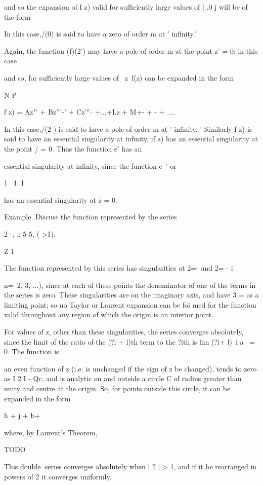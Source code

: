 {{{{and so the expansion of f z) valid for sufficiently large values of |
.0 j will be of the form

In this case,/(0) is said to have a zero of order m at ' infinity.'

%
%

Again, the function (f)(2') may have a pole of order m at the point z'
= 0; in this case

and so, for sufficiently large values of \ z\, f(z) can be expanded in
the form

N P

f z) = Az"' + Bz'''-' + Cz'"-- +...+Lz + M+- + - + ....

In this case,/(2 ) is said to have a pole of order m at ' infinity. '
Similarly f z) is said to have an essential singularity at infinity,
if z) has an essential singularity at the point / = 0. Thus the
function e' has an

essential singularity at infinity, since the function e~' or

1 \ 1\ 1

has an essential singularity at z = 0.

Example. Discuss the function represented by the series

2 -, :; 5-5, ( >1).

Z 1

The function represented by this series has singularities at 2=- and
2= - i

 n=\, 2, 3, ...), since at each of these points the denominator of one
of the terms in the series is zero. These singularities are on the
imaginary axis, and have 3 = as a limiting point; so no Taylor or
Laurent expansion can be foi med for the function valid throughout any
region of which the origin is an interior point.

For values of z, other than these singularities, the series converges
absolutely, since the limit of the ratio of the (?i + l)th term to the
?ith is lim (?i+ l)~i a~ = 0. The function is

an even function of z (i.e. is unchanged if the sign of z be changed),
tends to zero as I 2 I - Qc, and is analytic on and outside a circle
C of radius greater than unity and centre at the origin. So, for
points outside this circle, it can be expanded in the form

h + j + b+

where, by Laurent's Theorem,

TODO

This double .series converges absolutely when | 2 | > 1, and if it be
rearranged in powers of 2 it converges uniformly.

}}}}
